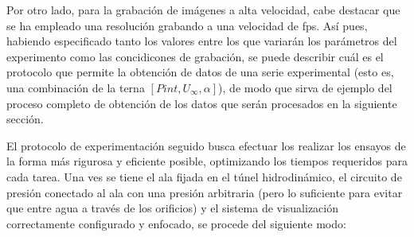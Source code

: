 Por otro lado, para la grabación de imágenes a alta velocidad, cabe destacar que se ha empleado una resolución %
grabando a una velocidad de %
fps. Así pues, habiendo especificado tanto los valores entre los que variarán los parámetros del experimento como las concidicones de grabación, se puede describir cuál es el protocolo que permite la obtención de datos de una serie experimental (esto es, una combinación de la terna $\left[Pint,U_{\infty},\alpha\right]$), de modo que sirva de ejemplo del proceso completo de obtención de los datos que serán procesados en la siguiente sección. 

El protocolo de experimentación seguido busca efectuar los realizar los ensayos de la forma más rigurosa y eficiente posible, optimizando los tiempos requeridos para cada tarea. Una ves se tiene el ala fijada en el túnel hidrodinámico, el circuito de presión conectado al ala con una presión arbitraria (pero lo suficiente para evitar que entre agua a través de los orificios) y el sistema de visualización correctamente configurado y enfocado, se procede del siguiente modo:


